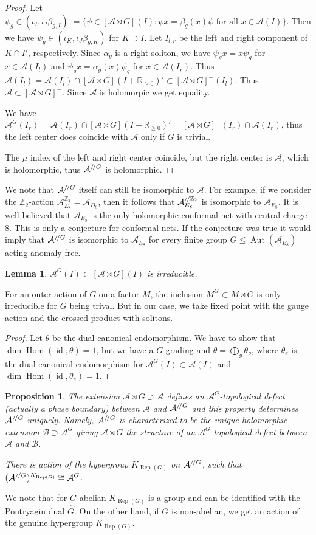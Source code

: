 \documentclass[twoside,11pt,reqno]{amsart}
\newtheorem{lem}[thm]{Lemma}
\newtheorem{prop}[thm]{Proposition}
\theoremstyle{definition}
\theoremstyle{remark}
\newcommand{\cB}{\mathcal{B}}
\newcommand{\A}{\mathcal{A}}
\newcommand{\RR}{\mathbb{R}}
\newcommand{\ZZ}{\mathbb{Z}}
\DeclareMathOperator{\Rep}{Rep}
\DeclareMathOperator{\Hom}{Hom}
\DeclareMathOperator{\id}{id}
\DeclareMathOperator{\Aut}{Aut}
\begin{document}
\begin{proof} 
  Let $\psi_g\in (\iota_I,\iota_I\beta_{g,I}):= 
    \{\psi\in [\A\rtimes G](I):\psi x=\beta_g(x)\psi \text{ for all } 
    x\in\A(I)\}$.
  Then we have $\psi_g\in(\iota_K,\iota_J\beta_{g,K})$ for $K\supset I$.
  Let $I_{l,r}$ be the left and right component of $K\cap I'$, respectively.
  Since $\alpha_g$ is a right soliton, we have $\psi_gx=x\psi_g$ for 
  $x\in \A(I_l)$ and $\psi_gx=\alpha_g(x)\psi_g$ for $x\in \A(I_r)$.
  Thus $\A(I_l)
    =\A(I_l)\cap[\A\rtimes G](I+\RR_{\geq 0})'\subset [\A\rtimes G]^-(I_l)$.
  Thus $\A\subset [\A\rtimes G]^-$. 
  Since $\A$ is holomorpic we get equality.
  
  We have $\A^G(I_r)=\A(I_r)\cap [\A\rtimes G](I -\RR_{\geq 0})'
    =[\A\rtimes G]^+(I_r)\cap\A(I_r)$,
  thus the left center does coincide with $\A$ only if $G$ is trivial.
  
  The $\mu$ index of the left and right center coincide, but the right center 
  is $\A$, which is holomorphic, thus $\A^{\TO G}$ is holomorphic. 
\end{proof}
We note that $\A^{\TO G}$ itself can still be isomorphic to $\A$.
For example, if we consider the $\ZZ_2$-action $\A_{E_8}^{\ZZ_2}=\A_{D_8}$, 
then it follows that $\A_{E_8}^{\TO \ZZ_2}$ is isomorphic to $\A_{E_8}$.
It is well-believed that $\A_{E_8}$ is the only holomorphic conformal net with 
central charge $8$.
This is only a conjecture for conformal nets. 
If the conjecture was true it would imply that
$\A^{\TO G}$ is isomorphic to $\A_{E_8}$ for every finite group 
$G\leq \Aut(\A_{E_8})$ acting anomaly free.

\begin{lem} 
  $\A^G(I)\subset [\A\rtimes G](I)$ is irreducible.
\end{lem}
For an outer action of $G$ on a factor $M$, the inclusion 
$M^G\subset M\rtimes G$ is only irreducible for $G$ being trival. 
But in our case, we take fixed point with the gauge action and the 
crossed product with solitons.
\begin{proof}
  Let $\theta$ be the dual canonical endomorphism.
  We have to show that $\dim\Hom(\id,\theta)=1$, but we have a $G$-grading and 
  $\theta=\bigoplus_g\theta_g$, where $\theta_{e}$ is the dual canonical 
  endomorphism for $\A^G(I)\subset \A(I)$ and $\dim\Hom(\id,\theta_e)=1$.
\end{proof}

\begin{prop} 
  The extension $\A\rtimes G\supset \A$ defines an $\A^G$-topological defect
  (actually a phase boundary) between $\A$ and $\A^{\TO G}$ and this property 
  determines $\A^{\TO G}$ uniquely. 
  Namely, $\A^{\TO G}$  is characterized to be the unique holomorphic extension
  $\cB\supset\A^G$ giving $\A\rtimes G$ the structure of an $\A^G$-topological
  defect between $\A$ and $\cB$.

  There is action of the hypergroup $K_{\Rep(G)}$ on $\A^{\TO G}$, such 
  that $(\A^{\TO G})^{K_{\Rep(G)}}\cong \A^G$.
\end{prop}
We note that for $G$ abelian $K_{\Rep(G)}$ is a group and can be identified 
with the Pontryagin dual $\hat G$. 
On the other hand, if $G$ is non-abelian, we get an action of the genuine 
hypergroup $K_{\Rep(G)}$.
\end{document}
